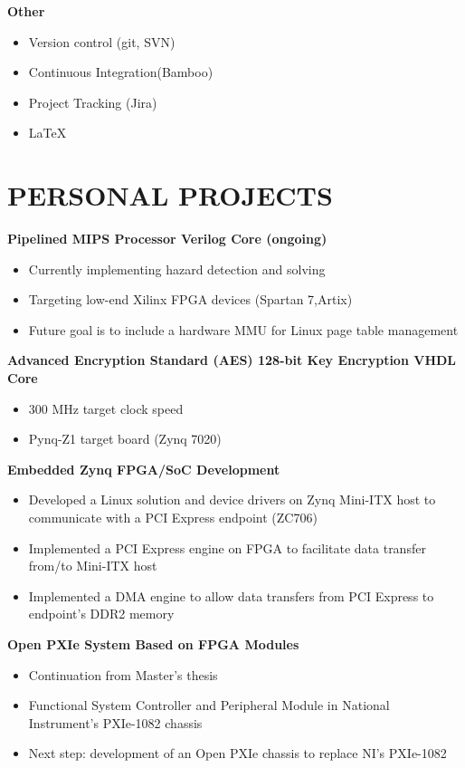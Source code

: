 \documentclass[3pt]{res}
\begin{document}
\begin{resume}
  {\bf Other}
    \begin{itemize}[noitemsep]
      \item Version control (git, SVN)
      \item Continuous Integration(Bamboo)
      \item Project Tracking (Jira)
      \item \LaTeX
    \end{itemize}

\section{PERSONAL PROJECTS}
\vspace{0.1in}
  
  {\bf Pipelined MIPS Processor Verilog Core (ongoing)}
  \begin{itemize}
    \item Currently implementing hazard detection and solving
    \item Targeting low-end Xilinx FPGA devices (Spartan 7,Artix)
    \item Future goal is to include a hardware MMU for Linux page table management
  \end{itemize}

  {\bf Advanced Encryption Standard (AES) 128-bit Key Encryption VHDL Core}
    \begin{itemize}
      \item 300 MHz target clock speed
      \item Pynq-Z1 target board (Zynq 7020)
    \end{itemize}

  {\bf Embedded Zynq FPGA/SoC Development}
    \begin{itemize}[noitemsep] %
      \item Developed a Linux solution and device drivers on Zynq Mini-ITX 
      host to communicate with a PCI Express endpoint (ZC706)
      \item Implemented a PCI Express engine on FPGA to facilitate data transfer 
            from/to Mini-ITX host
      \item Implemented a DMA engine to allow data transfers from PCI Express 
            to endpoint's DDR2 memory
    \end{itemize}

 {\bf Open PXIe System Based on FPGA Modules}
    \begin{itemize}[noitemsep] %
      \item Continuation from Master's thesis
      \item Functional System Controller and Peripheral Module in National Instrument's PXIe-1082 chassis
      \item Next step: development of an Open PXIe chassis to replace NI's PXIe-1082
    \end{itemize}


\end{resume}
\end{document}
